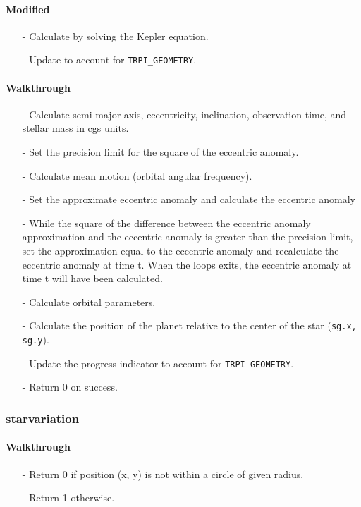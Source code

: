 \documentclass[letterpaper,12pt]{article}
\begin{document}
\paragraph{Modified}
\begin{enumerate}[leftmargin=10pt, noitemsep, parsep=0pt, topsep=0ex]
\item[-] Calculate  by solving the Kepler equation.
\item[-] Update  to account for {\tt TRPI\_GEOMETRY}.
\end{enumerate}

\paragraph{Walkthrough}
\begin{enumerate}[leftmargin=10pt, noitemsep, parsep=0pt, topsep=0ex]
\item[-] Calculate semi-major axis, eccentricity, inclination, observation time, and stellar mass in cgs units.
\item[-] Set the precision limit for the square of the eccentric anomaly.
\item[-] Calculate mean motion (orbital angular frequency).
\item[-] Set the approximate eccentric anomaly and calculate the eccentric anomaly
\item[-] While the square of the difference between the eccentric anomaly approximation and the eccentric anomaly is greater than the precision limit, set the approximation equal to the eccentric anomaly and recalculate the eccentric anomaly at time t. When the loops exits, the eccentric anomaly at time t will have been calculated.
\item[-] Calculate orbital parameters.
\item[-] Calculate the position of the planet relative to the center of the star ({\tt sg.x, sg.y}).
\item[-] Update the progress indicator to account for {\tt TRPI\_GEOMETRY}.
\item[-] Return 0 on success.
\end{enumerate}

\subsubsection{starvariation}
\paragraph{Walkthrough}
\begin{enumerate}[leftmargin=10pt, noitemsep, parsep=0pt, topsep=0ex]
\item[-] Return 0 if position (x, y) is not within a circle of given radius.
\item[-] Return 1 otherwise.
\end{enumerate}
\end{document}
